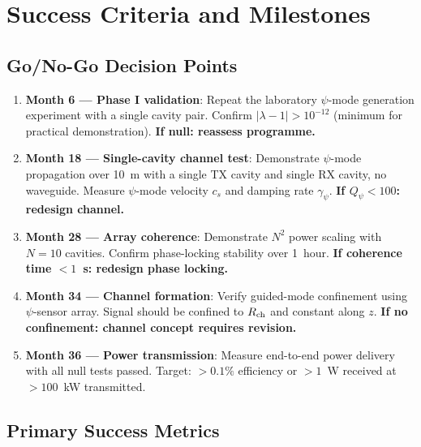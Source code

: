 \documentclass[11pt,letterpaper]{article}
\begin{document}
\section{Success Criteria and Milestones}

\subsection{Go/No-Go Decision Points}

\begin{enumerate}
\item \textbf{Month 6 --- Phase I validation}: Repeat the laboratory
$\psi$-mode generation experiment with a single cavity pair. Confirm
$|\lambda - 1| > 10^{-12}$ (minimum for practical demonstration).
\textbf{If null: reassess programme.}

\item \textbf{Month 18 --- Single-cavity channel test}: Demonstrate
$\psi$-mode propagation over 10~m with a single TX cavity and single
RX cavity, no waveguide. Measure $\psi$-mode velocity $c_s$ and
damping rate $\gamma_\psi$. \textbf{If $Q_\psi < 100$: redesign channel.}

\item \textbf{Month 28 --- Array coherence}: Demonstrate $N^2$ power
scaling with $N = 10$ cavities. Confirm phase-locking stability over
1~hour. \textbf{If coherence time $< 1$~s: redesign phase locking.}

\item \textbf{Month 34 --- Channel formation}: Verify guided-mode
confinement using $\psi$-sensor array. Signal should be confined to
$R_{\rm ch}$ and constant along $z$. \textbf{If no confinement: channel
concept requires revision.}

\item \textbf{Month 36 --- Power transmission}: Measure end-to-end
power delivery with all null tests passed. Target: $> 0.1\%$ efficiency
or $> 1$~W received at $> 100$~kW transmitted.
\end{enumerate}

\subsection{Primary Success Metrics}
\end{document}
